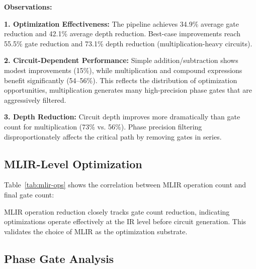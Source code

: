 \documentclass[a4paper,twocolumn]{article}
\begin{document}
\textbf{Observations:}

\textbf{1. Optimization Effectiveness:} The pipeline achieves 34.9\% average gate reduction and 42.1\% average depth reduction.
Best-case improvements reach 55.5\% gate reduction and 73.1\% depth reduction (multiplication-heavy circuits).

\textbf{2. Circuit-Dependent Performance:} Simple addition/subtraction shows modest improvements (15\%),
while multiplication and compound expressions benefit significantly (54--56\%). This reflects the distribution
of optimization opportunities, multiplication generates many high-precision phase gates that are aggressively filtered.

\textbf{3. Depth Reduction:} Circuit depth improves more dramatically than gate count for multiplication
(73\% vs. 56\%). Phase precision filtering disproportionately affects the critical path by removing gates in series.

\subsection{MLIR-Level Optimization}

Table~\ref{tab:mlir-ops} shows the correlation between MLIR operation count and final gate count:

\begin{table}[htbp]
  \centering
  \caption{MLIR Operations vs. Quantum Gates}
  \label{tab:mlir-ops}
\end{table}

MLIR operation reduction closely tracks gate count reduction, indicating optimizations operate
effectively at the IR level before circuit generation. This validates the choice of MLIR as the optimization substrate.

\subsection{Phase Gate Analysis}
\end{document}
